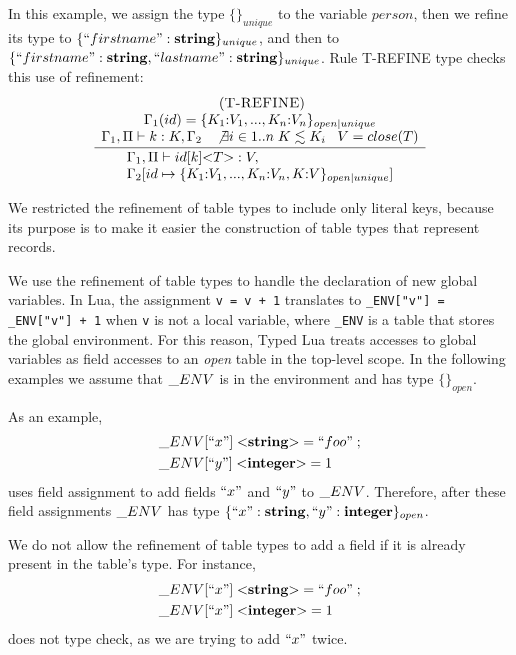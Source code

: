 \documentclass{sigplanconf}
\newcommand{\Integer}{\mathbf{integer}}
\newcommand{\String}{\mathbf{string}}
\newcommand{\mylabel}[1]{\; (\textsc{#1})}
\newcommand{\env}{\Gamma}
\newcommand{\penv}{\Pi}
\begin{document}
In this example, we assign the type $\{\}_{unique}$ to the variable
$person$, then we refine its type to $\{``firstname":\String\}_{unique}$,
and then to $\{``firstname":\String, ``lastname":\String\}_{unique}$.
Rule \textsc{T-REFINE} type checks this use of refinement:
\[
\begin{array}{c}
\mylabel{T-REFINE}\\
\dfrac{\begin{array}{c}
       \env_{1}(id) = \{ K_{1}{:}V_{1}, ..., K_{n}{:}V_{n} \}_{open|unique}\\
       \env_{1}, \penv \vdash k:K, \env_{2} \;\;\;
       \not \exists i \in 1..n \; K \lesssim K_{i} \;\;\;
       V = close(T)
       \end{array}}
      {\begin{array}{l}
       \env_{1}, \penv \vdash id[k] {<}T{>}:V, \\
       \env_{2}[id \mapsto \{ K_{1}{:}V_{1}, ..., K_{n}{:}V_{n}, K{:}V\}_{open|unique}]
       \end{array}}
\end{array}
\]

We restricted the refinement of table types to include only literal
keys, because its purpose is to make it easier the construction of
table types that represent records.

We use the refinement of table types to handle the declaration of
new global variables.
In Lua, the assignment \texttt{v = v + 1} translates to
\texttt{\string_ENV["v"] = \string_ENV["v"] + 1} when \texttt{v}
is not a local variable, where \texttt{\string_ENV} is a table
that stores the global environment.
For this reason, Typed Lua treats accesses to global variables as field accesses
to an \emph{open} table in the top-level scope.
In the following examples we assume that $\string_ENV$ is in the
environment and has type $\{\}_{open}$.

As an example,
\begin{align*}
& \string_ENV[``x"] \; {<}\String{>} = ``foo" \;; \\
& \string_ENV[``y"] \; {<}\Integer{>} = 1
\end{align*}
uses field assignment to add fields $``x"$ and $``y"$ to $\string_ENV$.
Therefore, after these field assignments $\string_ENV$ has type
$\{``x":\String, ``y":\Integer\}_{open}$.

We do not allow the refinement of table types to add a field if it is
already present in the table's type.
For instance,
\begin{align*}
& \string_ENV[``x"] \; {<}\String{>} = ``foo" \;; \\
& \string_ENV[``x"] \; {<}\Integer{>} = 1
\end{align*}
does not type check, as we are trying to add $``x"$ twice.
\end{document}
